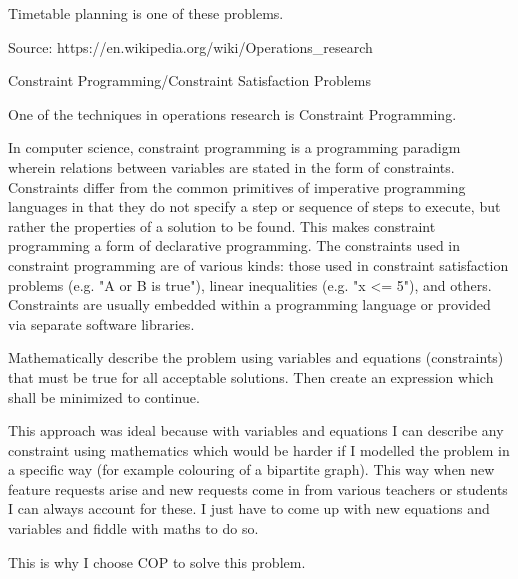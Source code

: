 Timetable planning is one of these problems.

Source: https://en.wikipedia.org/wiki/Operations\_research

Constraint Programming/Constraint Satisfaction Problems

One of the techniques in operations research is Constraint Programming.

In computer science, constraint programming is a programming paradigm wherein relations between variables are stated in the form of constraints. Constraints differ from the common primitives of imperative programming languages in that they do not specify a step or sequence of steps to execute, but rather the properties of a solution to be found. This makes constraint programming a form of declarative programming. The constraints used in constraint programming are of various kinds: those used in constraint satisfaction problems (e.g. "A or B is true"), linear inequalities (e.g. "x <= 5"), and others. Constraints are usually embedded within a programming language or provided via separate software libraries.

Mathematically describe the problem using variables and equations (constraints) that must be true for all acceptable solutions. Then create an expression which shall be minimized to continue.

This approach was ideal because with variables and equations I can describe any constraint using mathematics which would be harder if I modelled the problem in a specific way (for example colouring of a bipartite graph). This way when new feature requests arise and new requests come in from various teachers or students I can always account for these. I just have to come up with new equations and variables and fiddle with maths to do so.

This is why I choose COP to solve this problem.


